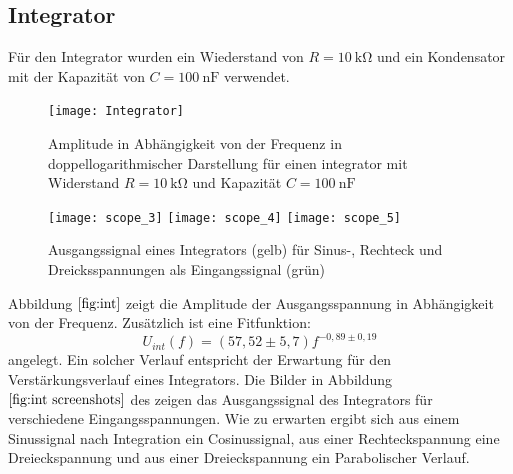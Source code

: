 \subsection{Integrator}
Für den Integrator wurden ein Wiederstand von $R=\SI{10}{\kilo\ohm}$ und ein Kondensator mit der Kapazität von $C=\SI{100}{\nano\farad}$ verwendet.
\begin{figure}
\centering
\texttt{[image: Integrator]}
\label{fig:int}
\caption{Amplitude in Abhängigkeit von der Frequenz in doppellogarithmischer Darstellung für einen integrator mit Widerstand $R=\SI{10}{\kilo\ohm}$ und Kapazität $C=\SI{100}{\nano\farad}$}
\end{figure}
\begin{figure}
\centering
\texttt{[image: scope\_3]}
\texttt{[image: scope\_4]}
\texttt{[image: scope\_5]}
\label{fig:int screenshots}
\caption{Ausgangssignal eines Integrators (gelb) für Sinus-, Rechteck und Dreicksspannungen als Eingangssignal (grün)}
\end{figure}
Abbildung $\ref{fig:int}$ zeigt die Amplitude der Ausgangsspannung in Abhängigkeit von der Frequenz. Zusätzlich ist eine Fitfunktion:
\begin{equation}
U_{int}(f)=(57,52\pm5,7)f^{-0,89\pm0,19}
\end{equation}
angelegt. Ein solcher Verlauf entspricht der Erwartung für den Verstärkungsverlauf eines Integrators.
Die Bilder in Abbildung $\ref{fig:int screenshots}$ des zeigen das Ausgangssignal des Integrators für verschiedene Eingangsspannungen. Wie zu erwarten ergibt sich aus einem Sinussignal nach Integration ein Cosinussignal, aus einer Rechteckspannung eine Dreieckspannung und aus einer Dreieckspannung ein Parabolischer Verlauf.
